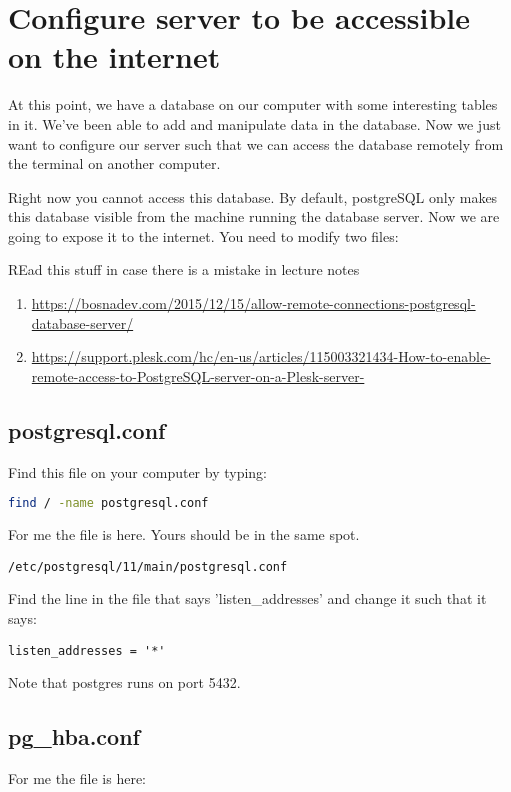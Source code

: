 \documentclass[12pt]{article}
\begin{document}
\section{ Configure server to be accessible on the internet }
At this point, we have a database on our computer with some interesting tables in it. We've been able to add and manipulate data in the database. Now we just want to configure our server such that we can access the database remotely from the terminal on another computer.

Right now you cannot access this database. By default, postgreSQL only makes this database visible from the machine running the database server. Now we are going to expose it to the internet. You need to modify two files:

REad this stuff in case there is a mistake in lecture notes
\begin{enumerate}
\item \url{https://bosnadev.com/2015/12/15/allow-remote-connections-postgresql-database-server/}
\item \url{https://support.plesk.com/hc/en-us/articles/115003321434-How-to-enable-remote-access-to-PostgreSQL-server-on-a-Plesk-server-}
\end{enumerate}

\subsection{postgresql.conf}
Find this file on your computer by typing:

\begin{lstlisting}[language=bash]
find / -name postgresql.conf
\end{lstlisting}

For me the file is here. Yours should be in the same spot.

\begin{verbatim}
/etc/postgresql/11/main/postgresql.conf 
\end{verbatim}

Find the line in the file that says 'listen\_addresses' and change it such that it says:

\begin{verbatim}
listen_addresses = '*'
\end{verbatim}

Note that postgres runs on port 5432.

\subsection{pg\_hba.conf}
 For me the file is here:
\end{document}
